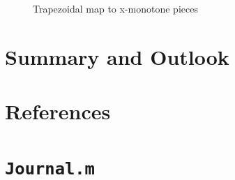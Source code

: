\def\CTeXPreproc{Created by ctex v0.2.14, don't edit!}\documentclass[11pt]{article}
\begin{document}
\begin{figure}[!h]
\begin{center}
\caption{Trapezoidal map to x-monotone pieces}
\end{center}
\end{figure}

\section{Summary and Outlook}

\section{References}

\section{\texttt{Journal.m}}

















\end{document}
